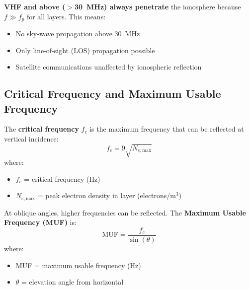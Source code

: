 \begin{keyconcept}
\textbf{VHF and above ($>$30~MHz) always penetrate} the ionosphere because $f \gg f_p$ for all layers. This means:
\begin{itemize}
\item No sky-wave propagation above 30~MHz
\item Only line-of-sight (LOS) propagation possible
\item Satellite communications unaffected by ionospheric reflection
\end{itemize}
\end{keyconcept}

\subsection{Critical Frequency and Maximum Usable Frequency}

The \textbf{critical frequency} $f_c$ is the maximum frequency that can be reflected at vertical incidence:
\begin{equation}
f_c = 9\sqrt{N_{e,\text{max}}}
\end{equation}
where:
\begin{itemize}
\item $f_c$ = critical frequency (Hz)
\item $N_{e,\text{max}}$ = peak electron density in layer (electrons/m$^3$)
\end{itemize}

At oblique angles, higher frequencies can be reflected. The \textbf{Maximum Usable Frequency (MUF)} is:
\begin{equation}
\text{MUF} = \frac{f_c}{\sin(\theta)}
\end{equation}
where:
\begin{itemize}
\item MUF = maximum usable frequency (Hz)
\item $\theta$ = elevation angle from horizontal
\end{itemize}

